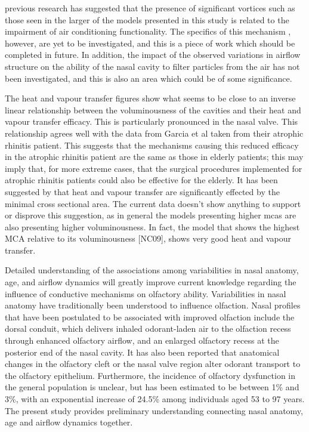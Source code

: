 previous research has suggested that the presence of significant vortices such as those seen in the larger of the models presented in this study is related to the impairment of air conditioning functionality. The specifics of this mechanism , however, are yet to be investigated, and this is a piece of work which should be completed in future. In addition, the impact of the observed variations in airflow structure on the ability of the nasal cavity to filter particles from the air has not been investigated, and this is also an area which could be of some significance.

The heat and vapour transfer figures show what seems to be close to an inverse linear relationship between the voluminousness of the cavities and their heat and vapour transfer efficacy. This is particularly pronounced in the nasal valve. This relationship agrees well with the data from Garcia et al \cite{Garcia2007} taken from their atrophic rhinitis patient. This suggests that the mechanisms causing this reduced efficacy in the atrophic rhinitis patient are the same as those in elderly patients; this may imply that, for more extreme cases, that the surgical procedures implemented for atrophic rhinitis patients could also be effective for the elderly. It has been suggested by \cite{Lindemann2008} that heat and vapour transfer are significantly effected by the minimal cross sectional area. The current data doesn't show anything to support or disprove this suggestion, as in general the models presenting higher mcas are also presenting higher voluminousness. In fact, the model that shows the highest MCA relative to its voluminousness [NC09], shows very good heat and vapour transfer.

Detailed understanding of the associations among variabilities in nasal anatomy, age, and airflow dynamics will greatly improve current knowledge regarding the influence of conductive mechanisms on olfactory ability. Variabilities in nasal 
anatomy have traditionally been understood to influence olfaction\cite{Eiting2015, Craven2007}. Nasal profiles that have been postulated to be associated with improved olfaction include the dorsal conduit, which delivers inhaled odorant-laden air to the olfaction recess through enhanced olfactory airflow, and an enlarged olfactory recess at the posterior end of the nasal cavity\cite{Eiting2015, Craven2007, Eiting2014}. It has also been reported that anatomical changes in the olfactory cleft or the nasal valve region alter odorant transport to the olfactory epithelium\cite{Zhao2004a}. Furthermore, the incidence of olfactory dysfunction in the general population is unclear, but has been estimated to be between 1\% and 3\%, with an exponential increase of 24.5\% among individuals aged 53 to 97 years\cite{Landis2004, Braemerson2004, Wysocki1989, Hoffman1998, Murphy2002}. The present study provides preliminary understanding connecting nasal anatomy, age and airflow dynamics together.
